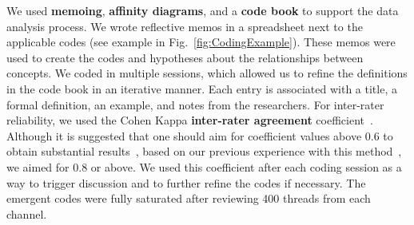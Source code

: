 We used \textbf{memoing}, \textbf{affinity diagrams}, and a \textbf{code book} to support the data analysis process. We wrote reflective memos in a spreadsheet next to the applicable codes (see example in Fig.~\ref{fig:CodingExample}). These memos were used to create the codes and hypotheses about the relationships between concepts. We coded in multiple sessions, which allowed us to refine the definitions in the code book 
in an iterative manner. Each entry is associated with a title, a formal definition, an example, and notes from the researchers. %
For inter-rater reliability, we used the Cohen Kappa \textbf{inter-rater agreement} coefficient~\cite{Stemler2004}. Although it is suggested that one should aim for coefficient values above 0.6 to obtain substantial results~\cite{Landis1977}, based on our previous experience with this method~\cite{Gomez2013}, we aimed for 0.8 or above. We used this coefficient after each coding session as a way to trigger discussion and to further refine the codes if necessary.  
The emergent codes were fully saturated after reviewing 400 threads from each channel. 





